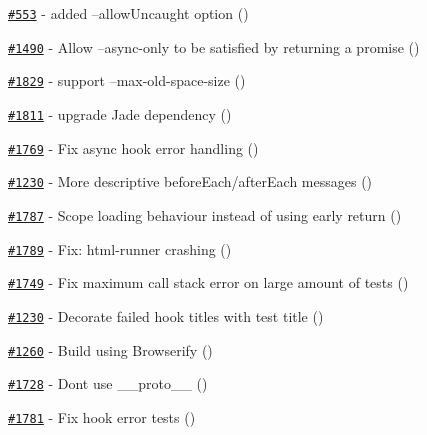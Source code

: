 \begin{DoxyItemize}
\item \href{https://github.com/mochajs/mocha/issues/553}{\tt \#553} -\/ added --allow\+Uncaught option (\href{https://github.com/amsul}{\tt })
\item \href{https://github.com/mochajs/mocha/issues/1490}{\tt \#1490} -\/ Allow --async-\/only to be satisfied by returning a promise (\href{https://github.com/jlai}{\tt })
\item \href{https://github.com/mochajs/mocha/issues/1829}{\tt \#1829} -\/ support --max-\/old-\/space-\/size (\href{https://github.com/gigadude}{\tt })
\item \href{https://github.com/mochajs/mocha/issues/1811}{\tt \#1811} -\/ upgrade Jade dependency (\href{https://github.com/outsideris}{\tt })
\item \href{https://github.com/mochajs/mocha/issues/1769}{\tt \#1769} -\/ Fix async hook error handling (\href{https://github.com/ajaykodali}{\tt })
\item \href{https://github.com/mochajs/mocha/issues/1230}{\tt \#1230} -\/ More descriptive before\+Each/after\+Each messages (\href{https://github.com/duncanbeevers}{\tt })
\item \href{https://github.com/mochajs/mocha/issues/1787}{\tt \#1787} -\/ Scope loading behaviour instead of using early return (\href{https://github.com/aryeguy}{\tt })
\item \href{https://github.com/mochajs/mocha/issues/1789}{\tt \#1789} -\/ Fix\+: html-\/runner crashing (\href{https://github.com/sunesimonsen}{\tt })
\item \href{https://github.com/mochajs/mocha/issues/1749}{\tt \#1749} -\/ Fix maximum call stack error on large amount of tests (\href{https://github.com/tinganho}{\tt })
\item \href{https://github.com/mochajs/mocha/issues/1230}{\tt \#1230} -\/ Decorate failed hook titles with test title (\href{https://github.com/duncanbeevers}{\tt })
\item \href{https://github.com/mochajs/mocha/issues/1260}{\tt \#1260} -\/ Build using Browserify (\href{https://github.com/ndhoule}{\tt })
\item \href{https://github.com/mochajs/mocha/issues/1728}{\tt \#1728} -\/ Don\textquotesingle{}t use {\ttfamily \+\_\+\+\_\+proto\+\_\+\+\_\+} (\href{https://github.com/ndhoule}{\tt })
\item \href{https://github.com/mochajs/mocha/issues/1781}{\tt \#1781} -\/ Fix hook error tests (\href{https://github.com/glenjamin}{\tt })

\end{DoxyItemize}
